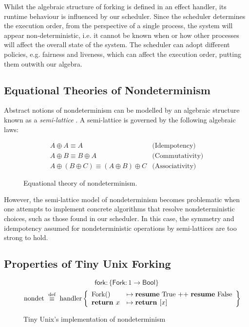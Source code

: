 \documentclass[logo,bsc,singlespacing,parskip]{infthesis}
\begin{document}
Whilst the algebraic structure of forking is defined in an effect handler, its runtime behaviour is influenced by our scheduler. Since the scheduler determines the execution order, from the perspective of a single process, the system will appear non-deterministic, i.e. it cannot be known when or how other processes will affect the overall state of the system. The scheduler can adopt different policies, e.g. fairness and liveness, which can affect the execution order, putting them outwith our algebra.


\subsection{Equational Theories of Nondeterminism}
Abstract notions of nondeterminism can be modelled by an algebraic structure known as a \textit{semi-lattice} \cite{Pretnar:2010}. A semi-lattice is governed by the following algebraic laws:

\begin{figure}[H]
\centering
\[
\begin{array}{ll}
  A \oplus A \equiv A & \text{(Idempotency)} \\
  A \oplus B \equiv B \oplus A & \text{(Commutativity)} \\
  A \oplus (B \oplus C) \equiv (A \oplus B) \oplus C & \text{(Associativity)}
\end{array}
\]
\caption{%
  Equational theory of nondeterminism.
}
\end{figure}



However, the semi-lattice model of nondeterminism becomes problematic when one attempts to implement concrete algorithms that resolve nondeterministic choices, such as those found in our scheduler. In this case, the symmetry and idempotency assumed for nondeterministic operations by semi-lattices are too strong to hold.



\subsection{Properties of Tiny Unix Forking}


\begin{figure}[H]
\centering
\[
\mathsf{fork} : \{ \mathsf{Fork} : 1 \rightarrow \mathsf{Bool} \}
\]
\vspace{-1em}
\[
\text{nondet} \ \overset{\text{def}}{\equiv} \ \text{handler} \left\{
\begin{array}{ll}
\text{Fork}() &\mapsto \text{\textbf{resume} True ++ \textbf{resume} False} \\
\textbf{return } x &\mapsto \textbf{return } [x]
\end{array}
\right\}
\]
\caption{Tiny Unix's implementation of nondeterminism}
\label{nondetImplementation}
\end{figure}
\end{document}
